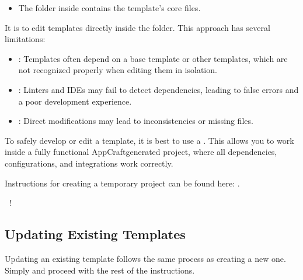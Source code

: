 \documentclass[letterpaper,10pt,english]{sphinxhowto}
\begin{document}
\begin{description}
\begin{itemize}
\item {} 
\sphinxAtStartPar
The  folder inside contains the template’s core files.

\end{itemize}

\sphinxAtStartPar
It is  to edit templates directly inside the  folder. This approach has several limitations:
\begin{description}
\begin{itemize}
\item {} 
\sphinxAtStartPar
{}: Templates often depend on a base template or other templates, which are not recognized properly when editing them in isolation.

\item {} 
\sphinxAtStartPar
{}: Linters and IDEs may fail to detect dependencies, leading to false errors and a poor development experience.

\item {} 
\sphinxAtStartPar
{}: Direct modifications may lead to inconsistencies or missing files.

\end{itemize}

\end{description}

\sphinxAtStartPar
{}
To safely develop or edit a template, it is best to use a . This allows you to work inside a fully functional AppCraft\sphinxhyphen{}generated project, where all dependencies, configurations, and integrations work correctly.

\sphinxAtStartPar
Instructions for creating a temporary project can be found here: {\hyperref[\detokenize{contributing/index:id5}]{}}.

\end{description}

️⃣ !


\subsection{Updating Existing Templates}
\label{\detokenize{contributing/index:id3}}
\sphinxAtStartPar
Updating an existing template follows the same process as creating a new one.
Simply  and proceed with the rest of the instructions.
\end{document}
